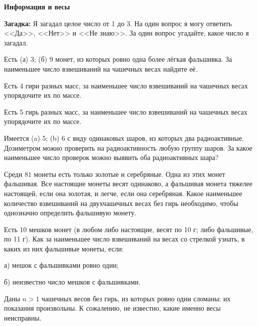 \documentclass{article}
\begin{document}
    \large


    \begin{center}
        \textbf{Информация и весы}
    \end{center}

    \textbf{Загадка:} Я загадал целое число от 1 до 3.
    На один вопрос я могу ответить <<Да>>, <<Нет>> и <<Не знаю>>.
    За один вопрос угадайте, какое число я загадал.


    \begin{enumerate_boxed}

        \item Есть (а) 3; (б) 9 монет, из которых ровно одна более лёгкая фальшивка.
        За наименьшее число взвешиваний на чашечных весах найдите её.


        \item Есть 4 гири разных масс, за наименьшее число взвешиваний на чашечных весах упорядочите их по массе.

        \item Есть 5 гирь разных масс, за наименьшее число взвешиваний на чашечных весах упорядочите их по массе.

        \item Имеется (a) 5; (b) 6 с виду одинаковых шаров, из которых два радиоактивные.
        Дозиметром можно проверить на радиоактивность любую группу шаров.
        За какое наименьшее число проверок можно выявить оба радиоактивных шара?

        \item Среди $81$ монеты есть только золотые и серебряные.
        Одна из этих монет фальшивая.
        Все настоящие монеты весят одинаково, а фальшивая монета тяжелее настоящей, если она золотая, и легче, если она серебряная.
        Какое наименьшее количество взвешиваний на двухчашечных весах без гирь необходимо, чтобы однозначно определить фальшивую монету.

        \item Есть 10 мешков монет (в любом либо настоящие, весят по 10 г; либо фальшивые, по 11 г).
        Как за наименьшее число взвешиваний на весах со стрелкой узнать, в каких из них фальшивые монеты, если:

        а) мешок с фальшивками ровно один;

        б) неизвестно число мешков с фальшивками.

        \item Даны $n > 1$ чашечных весов без гирь, из которых ровно одни сломаны: их показания произвольны.
        К сожалению, не известно, какие именно весы неисправны.


\end{enumerate_boxed}
\end{document}
